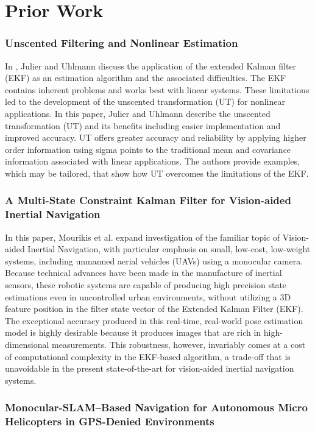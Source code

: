 \chapter{Prior Work}

\subsection{Unscented Filtering and Nonlinear Estimation}

In \cite{Julier2004}, Julier and Uhlmann discuss the application of the extended Kalman filter (EKF) as an estimation algorithm and the associated difficulties. The EKF contains inherent problems and works best with linear systems. These limitations led to the development of the unscented transformation (UT) for nonlinear applications. In this paper, Julier and Uhlmann describe the unscented transformation (UT) and its benefits including easier implementation and improved accuracy. UT offers greater accuracy and reliability by applying higher order information using sigma points to the traditional mean and covariance information associated with linear applications. The authors provide examples, which may be tailored, that show how UT overcomes the limitations of the EKF.

\subsection{A Multi-State Constraint Kalman Filter for Vision-aided Inertial Navigation}

In this paper, Mourikis et al. expand investigation of the familiar topic of Vision-aided Inertial Navigation, with particular emphasis on small, low-cost, low-weight systems, including unmanned aerial vehicles (UAVs) using a monocular camera. Because technical advances have been made in the manufacture of inertial sensors, these robotic systems are capable of producing high precision state estimations even in uncontrolled urban environments, without utilizing a 3D feature position in the filter state vector of the Extended Kalman Filter (EKF). The exceptional accuracy produced in this real-time, real-world pose estimation model is highly desirable because it produces images that are rich in high-dimensional measurements. This robustness, however, invariably comes at a cost of computational complexity in the EKF-based algorithm, a trade-off that is unavoidable in the present state-of-the-art for vision-aided inertial navigation systems.

\subsection{Monocular-SLAM–Based Navigation for Autonomous Micro Helicopters in GPS-Denied Environments}

